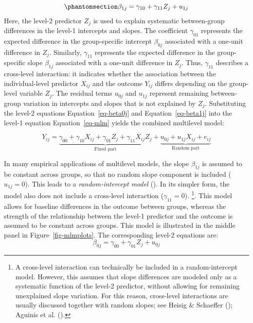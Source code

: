 \documentclass[
  letterpaper,
  11pt,
  english,
  singlespacing,
  headsepline,
  openany]{MastersDoctoralThesis}
\begin{document}
\begin{equation}\phantomsection\label{eq-beta1j}{
\beta_{1j}
=
\gamma_{10} + \gamma_{11}Z_{j}
+
u_{1j}
}\end{equation} Here, the level-2 predictor \(Z_j\) is used to explain
systematic between-group differences in the level-1 intercepts and
slopes. The coefficient \(\gamma_{01}\) represents the expected
difference in the group-specific intercept \(\beta_{0j}\) associated
with a one-unit difference in \(Z_j\). Similarly, \(\gamma_{11}\)
represents the expected difference in the group-specific slope
\(\beta_{1j}\) associated with a one-unit difference in \(Z_j\). Thus,
\(\gamma_{11}\) describes a cross-level interaction: it indicates
whether the association between the individual-level predictor
\(X_{ij}\) and the outcome \(Y_{ij}\) differs depending on the
group-level variable \(Z_j\). The residual terms \(u_{0j}\) and
\(u_{1j}\) represent remaining between-group variation in intercepts and
slopes that is not explained by \(Z_j\). Substituting the level-2
equations Equation~\ref{eq-beta0j} and Equation~\ref{eq-beta1j} into the
level-1 equation Equation~\ref{eq-mlm} yields the combined multilevel
model:

\[
Y_{ij} =
\underbrace{\gamma_{00} + \gamma_{10}X_{ij} + \gamma_{01}Z_{j} + \gamma_{11}X_{ij}Z_{j}}_{\text{Fixed part}}
+
\underbrace{u_{0j} + u_{1j}X_{ij} + e_{ij}}_{\text{Random part}}
\]

In many empirical applications of multilevel models, the slope
\(\beta_{1j}\) is assumed to be constant across groups, so that no
random slope component is included (\(u_{1j} = 0\)). This leads to a
\emph{random-intercept model} (). In its simpler form, the model also does not
include a cross-level interaction (\(\gamma_{11} = 0\)). \footnote{A
  cross-level interaction can technically be included in a
  random-intercept model. However, this assumes that slope differences
  are modeled only as a systematic function of the level-2 predictor,
  without allowing for remaining unexplained slope variation. For this
  reason, cross-level interactions are usually discussed together with
  random slopes; see Heisig \& Schaeffer ();
  Aguinis et al. ().}. This model allows for
baseline differences in the outcome between groups, whereas the strength
of the relationship between the level-1 predictor and the outcome is
assumed to be constant across groups. This model is illustrated in the
middle panel in Figure~\ref{fig-mlmplots}. The corresponding level-2
equations are: \[
\beta_{0j} = \gamma_{00} + \gamma_{01}Z_j + u_{0j}
\]
\end{document}
